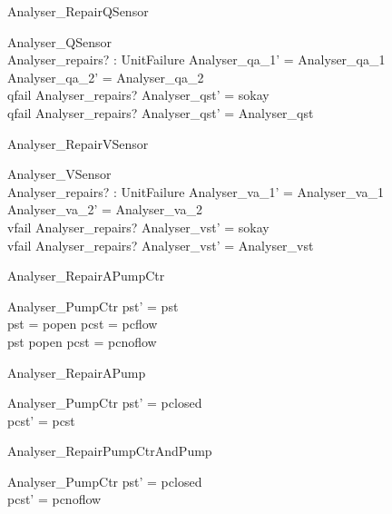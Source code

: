 \documentclass{article}
\begin{document}
\begin{schema}{Analyser\_RepairQSensor}

 \Delta Analyser\_QSensor \\
 Analyser\_repairs? : \power UnitFailure 
\where
 Analyser\_qa\_1' = Analyser\_qa\_1 \\
 Analyser\_qa\_2' = Analyser\_qa\_2 \\
 qfail \in Analyser\_repairs? \implies Analyser\_qst' = sokay \\
 qfail \notin Analyser\_repairs? \implies Analyser\_qst' = Analyser\_qst
\end{schema}

\begin{schema}{Analyser\_RepairVSensor}

 \Delta Analyser\_VSensor \\
 Analyser\_repairs? : \power UnitFailure 
\where
 Analyser\_va\_1' = Analyser\_va\_1 \\
 Analyser\_va\_2' = Analyser\_va\_2 \\
 vfail \in Analyser\_repairs? \implies Analyser\_vst' = sokay \\
 vfail \notin Analyser\_repairs? \implies Analyser\_vst' = Analyser\_vst
\end{schema}

\begin{schema}{Analyser\_RepairAPumpCtr}

 \Delta Analyser\_PumpCtr 
\where
 pst' = pst \\
 pst = popen \implies pcst = pcflow \\
 pst \neq popen \implies pcst = pcnoflow
\end{schema}

\begin{schema}{Analyser\_RepairAPump}

 \Delta Analyser\_PumpCtr 
\where
 pst' = pclosed \\
 pcst' = pcst
\end{schema}

\begin{schema}{Analyser\_RepairPumpCtrAndPump}

 \Delta Analyser\_PumpCtr 
\where
 pst' = pclosed \\
 pcst' = pcnoflow
\end{schema}
\end{document}
